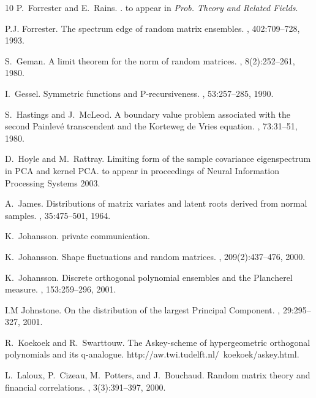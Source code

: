 \documentclass[11pt]{article}
\begin{document}
\begin{thebibliography}{10}
P.~Forrester and E.~Rains.
.
\newblock to appear in \emph{Prob. Theory and Related Fields}.

P.J. Forrester.
\newblock The spectrum edge of random matrix ensembles.
, 402:709--728, 1993.

S.~Geman.
\newblock A limit theorem for the norm of random matrices.
, 8(2):252--261, 1980.

I.~Gessel.
\newblock Symmetric functions and {P}-recursiveness.
, 53:257--285, 1990.

S.~Hastings and J.~McLeod.
\newblock A boundary value problem associated with the second {P}ainlev{\'e}
  transcendent and the {K}orteweg de {V}ries equation.
, 73:31--51, 1980.

D.~Hoyle and M.~Rattray.
\newblock Limiting form of the sample covariance eigenspectrum in {PCA} and
  kernel {PCA}.
\newblock to appear in proceedings of {Neural Information Processing Systems
  2003}.

A.~James.
\newblock Distributions of matrix variates and latent roots derived from normal
  samples.
, 35:475--501, 1964.

K.~Johansson.
\newblock private communication.

K.~Johansson.
\newblock Shape fluctuations and random matrices.
, 209(2):437--476, 2000.

K.~Johansson.
\newblock Discrete orthogonal polynomial ensembles and the {P}lancherel
  measure.
, 153:259--296, 2001.

I.M Johnstone.
\newblock On the distribution of the largest {P}rincipal {C}omponent.
, 29:295--327, 2001.

R.~Koekoek and R.~Swarttouw.
\newblock The {A}skey-scheme of hypergeometric orthogonal polynomials and its
  q-analogue.
\newblock http://aw.twi.tudelft.nl/~koekoek/askey.html.

L.~Laloux, P.~Cizeau, M.~Potters, and J.~Bouchaud.
\newblock Random matrix theory and financial correlations.
, 3(3):391--397, 2000.


\end{thebibliography}
\end{document}
